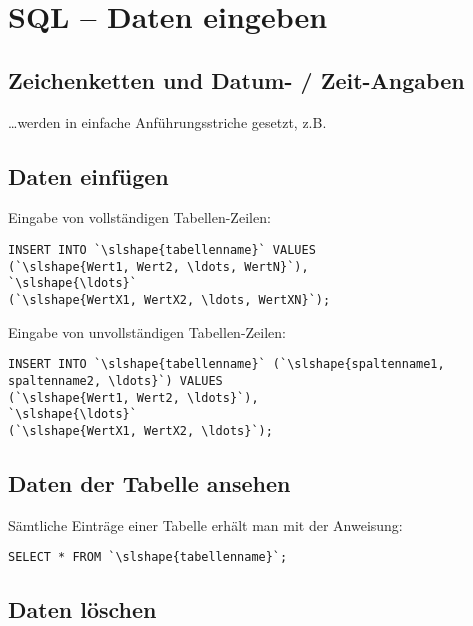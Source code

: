\section{SQL -- Daten eingeben}

\subsection{Zeichenketten und Datum- / Zeit-Angaben}

\ldots werden in einfache Anführungsstriche gesetzt, z.B.


\subsection{Daten einfügen}

\begin{compactenum}[a)] 
  \item Eingabe von vollständigen Tabellen-Zeilen:

\begin{lstlisting}
INSERT INTO `\slshape{tabellenname}` VALUES
(`\slshape{Wert1, Wert2, \ldots, WertN}`),
`\slshape{\ldots}`
(`\slshape{WertX1, WertX2, \ldots, WertXN}`);
\end{lstlisting}
  
  \item Eingabe von unvollständigen Tabellen-Zeilen:
  
\begin{lstlisting}
INSERT INTO `\slshape{tabellenname}` (`\slshape{spaltenname1, spaltenname2, \ldots}`) VALUES 
(`\slshape{Wert1, Wert2, \ldots}`),
`\slshape{\ldots}`
(`\slshape{WertX1, WertX2, \ldots}`);
\end{lstlisting}
\end{compactenum}


\subsection{Daten der Tabelle ansehen}

Sämtliche Einträge einer Tabelle erhält man mit der Anweisung:

\begin{lstlisting}
SELECT * FROM `\slshape{tabellenname}`;
\end{lstlisting}

\subsection{Daten löschen}

